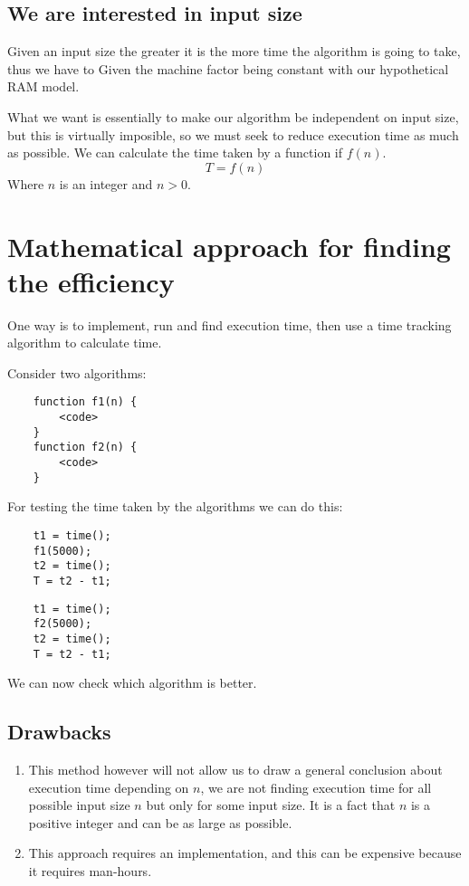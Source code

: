 \subsection{We are interested in input size}
Given an input size the greater it is the more time the algorithm is going to take, thus we have to 
Given the machine factor being constant with our hypothetical RAM model.
\par 
What we want is essentially to make our algorithm be independent on input size, but this is virtually imposible, so we must seek to reduce execution time as much as possible. We can calculate the time taken by a function if $f(n)$.
\[
  T = f(n)
\]
Where $n$ is an integer and $n>0$.



\section{Mathematical approach for finding the efficiency}
One way is to implement, run and find execution time, then use a time tracking algorithm to calculate time. 
\par 
Consider two algorithms: 
\begin{lstlisting}
    function f1(n) {
        <code>
    }
    function f2(n) {
        <code>
    }
\end{lstlisting}
For testing the time taken by the algorithms we can do this:
\begin{lstlisting}
    t1 = time(); 
    f1(5000);
    t2 = time();
    T = t2 - t1; 
\end{lstlisting}
\begin{lstlisting}
    t1 = time(); 
    f2(5000);
    t2 = time();
    T = t2 - t1; 
\end{lstlisting}
We can now check which algorithm is better. 

\subsection{Drawbacks}
\begin{enumerate}
    \item This method however will not allow us to draw a general conclusion about execution time depending on $n$, we are not finding execution time for all possible input size $n$ but only for some input size. It is a fact that $n$ is a positive integer and can be as large as possible. 
    \item This approach requires an implementation, and this can be expensive because it requires man-hours. 
\end{enumerate}



